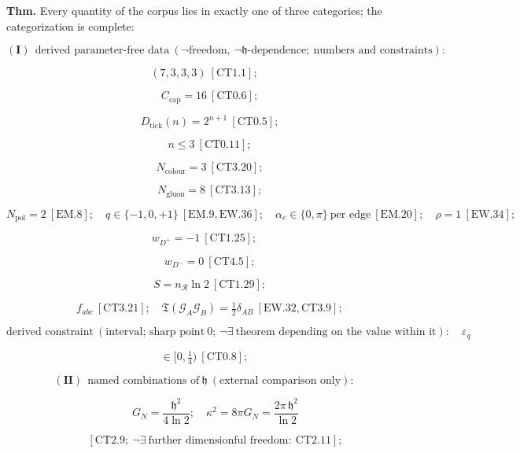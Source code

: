 \begin{theorem}\label{tag:CT4-13}
\textbf{Thm.} Every quantity of the corpus lies in exactly one of three categories; the categorization is complete:

\[
(\mathbf{I})\ \ \text{derived parameter-free data}\ (\neg\text{freedom},\ \neg\mathfrak h\text{-dependence};\ \text{numbers and constraints}):
\]

\[
(7,3,3,3)\ [\mathrm{CT1.1}];
\]

\[
\quad C_{\mathrm{cap}}=16\ [\mathrm{CT0.6}];
\]

\[
\quad D_{\mathrm{tick}}(n)=2^{n+1}\ [\mathrm{CT0.5}];
\]

\[
\quad n\le3\ [\mathrm{CT0.11}];
\]

\[
\quad N_{\text{colour}}=3\ [\mathrm{CT3.20}];
\]

\[
\quad N_{\mathrm{gluon}}=8\ [\mathrm{CT3.13}];
\]

\[
N_{\mathrm{pol}}=2\ [\mathrm{EM.8}];\quad q\in\{-1,0,+1\}\ [\mathrm{EM.9},\mathrm{EW.36}];\quad\alpha_e\in\{0,\pi\}\ \text{per edge}\ [\mathrm{EM.20}];\quad\rho=1\ [\mathrm{EW.34}];
\]

\[
w_{D^+}=-1\ [\mathrm{CT1.25}];
\]

\[
\quad w_{D^-}=0\ [\mathrm{CT4.5}];
\]

\[
\quad S=n_{\mathcal R}\ln2\ [\mathrm{CT1.29}];
\]

\[
\quad f_{abc}\ [\mathrm{CT3.21}];\quad\mathfrak T(\mathcal G_A\mathcal G_B)=\tfrac12\delta_{AB}\ [\mathrm{EW.32},\mathrm{CT3.9}];
\]

\[
\text{derived constraint}\ (\text{interval; sharp point}\ 0;\ \neg\exists\ \text{theorem depending on the value within it}):\quad\varepsilon_q
\]

\[
\in [0,\tfrac14)\ [\mathrm{CT0.8}];
\]

\[
(\mathbf{II})\ \ \text{named combinations of}\ \mathfrak h\ (\text{external comparison only}):
\]

\[
\qquad G_N=\frac{\mathfrak h^2}{4\ln2};\quad\kappa^2=8\pi G_N=\frac{2\pi\,\mathfrak h^2}{\ln2}
\]

\[
\qquad [\mathrm{CT2.9};\ \neg\exists\ \text{further dimensionful freedom}:\ \mathrm{CT2.11}];
\]


\end{theorem}
